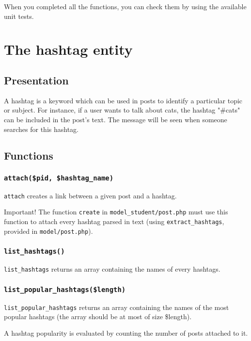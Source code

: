 \documentclass[twoside,a4paper,12pt]{article}
\begin{document}
When you completed all the functions, you can check them by using the available unit tests.

\section{The hashtag entity}

\subsection{Presentation}
A hashtag is a keyword which can be used in posts to identify a particular topic or subject. For instance, if a user wants to talk about cats, the hashtag "\#cats" can be included in the post's text. The message will be seen when someone searches for this hashtag.

\subsection{Functions}
\subsubsection{\texttt{attach(\$pid, \$hashtag\_name)}}
\texttt{attach} creates a link between a given post and a hashtag.

\begin{bclogo}[logo=\bcattention, noborder=true, barre=none]{Important!}
	The function \texttt{create} in \texttt{model\_student/post.php} must use this function to attach every hashtag parsed in text (using \texttt{extract\_hashtags}, provided in \texttt{model/post.php}).
\end{bclogo}

\subsubsection{\texttt{list\_hashtags()}}
\texttt{list\_hashtags} returns an array containing the names of every hashtags.

\subsubsection{\texttt{list\_popular\_hashtags(\$length)}}
\texttt{list\_popular\_hashtags} returns an array containing the names of the most popular hashtags (the array should be at most of size \$length).

A hashtag popularity is evaluated by counting the number of posts attached to it.
\end{document}
